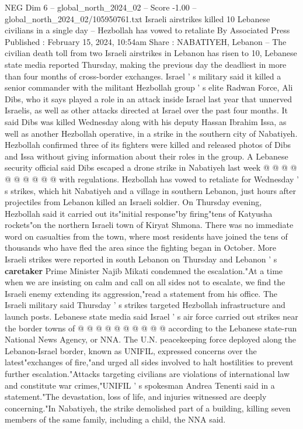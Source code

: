 \begin{textsample}{NEG Dim 6 – global\_north\_2024\_02 – Score -1.00 – global\_north\_2024\_02/105950761.txt}  \label{ex:f6_neg_247}
Israeli airstrikes killed 10 Lebanese civilians in a single day -- Hezbollah has vowed to retaliate By Associated Press Published : February 15, 2024, 10:54am Share : NABATIYEH, Lebanon -- The civilian death toll from two Israeli airstrikes in Lebanon has risen to 10, Lebanese state media reported Thursday, making the previous day the deadliest in more than four months of cross-border exchanges.
Israel ' s military said it killed a senior commander with the militant Hezbollah group ' s elite Radwan Force, Ali Dibs, who it says played a role in an attack inside Israel last year that unnerved Israelis, as well as other attacks directed at Israel over the past four months.
It said Dibs was killed Wednesday along with his deputy Hassan Ibrahim Issa, as well as another Hezbollah operative, in a strike in the southern city of Nabatiyeh.
Hezbollah confirmed three of its fighters were killed and released photos of Dibs and Issa without giving information about their roles in the group.
A Lebanese security official said Dibs escaped a drone strike in Nabatiyeh last week @ @ @ @ @ @ @ @ @ @ with regulations.
Hezbollah has vowed to retaliate for Wednesday ' s strikes, which hit Nabatiyeh and a village in southern Lebanon, just hours after projectiles from Lebanon killed an Israeli soldier.
On Thursday evening, Hezbollah said it carried out its"initial response"by firing"tens of Katyusha rockets"on the northern Israeli town of Kiryat Shmona.
There was no immediate word on casualties from the town, where most residents have joined the tens of thousands who have fled the area since the fighting began in October.
More Israeli strikes were reported in south Lebanon on Thursday and Lebanon ' s \textbf{caretaker} Prime Minister Najib Mikati condemned the escalation."At a time when we are insisting on calm and call on all sides not to escalate, we find the Israeli enemy extending its aggression,"read a statement from his office.
The Israeli military said Thursday ' s strikes targeted Hezbollah infrastructure and launch posts.
Lebanese state media said Israel ' s air force carried out strikes near the border towns of @ @ @ @ @ @ @ @ @ @ according to the Lebanese state-run National News Agency, or NNA.
The U.N. peacekeeping force deployed along the Lebanon-Israel border, known as UNIFIL, expressed concerns over the latest"exchanges of fire,"and urged all sides involved to halt hostilities to prevent further escalation."Attacks targeting civilians are violations of international law and constitute war crimes,"UNIFIL ' s spokesman Andrea Tenenti said in a statement."The devastation, loss of life, and injuries witnessed are deeply concerning."In Nabatiyeh, the strike demolished part of a building, killing seven members of the same family, including a child, the NNA said.

\end{textsample}

